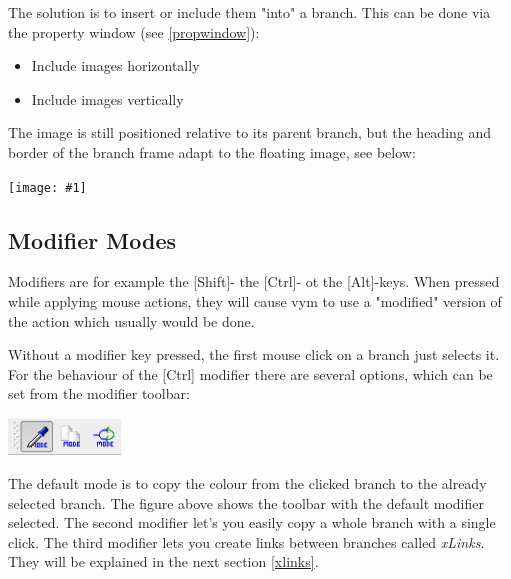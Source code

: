 \documentclass[12pt,a4paper]{article}
\newcommand{\maximage}[1]{  
    \begin{center}
        \texttt{[image: \#1]} 
    \end{center}
}
\newcommand{\vym}{{\sc vym }}
\newcommand{\key}[1]{[#1]}
\begin{document}
The solution is to insert or include them "into" a branch. This can be done via
the property window (see \ref{propwindow}):
\begin{itemize}
    \item Include images horizontally
    \item Include images vertically
\end{itemize}
The image is still positioned relative to its parent branch, but the
heading and border of the branch frame adapt to the floating image, see below: 
    \maximage{images/includeImages.png}

\subsection{Modifier Modes} 
Modifiers are for example the \key{Shift}- the \key{Ctrl}- ot the \key{Alt}-keys. When
pressed while applying mouse actions, they will cause \vym to use
a "modified" version of the action which usually would be done. 


Without a modifier key pressed, the first mouse click on a branch just selects
it. For the behaviour of the \key{Ctrl} modifier there are several
options, which can be set from the modifier toolbar:
\begin{center}
    \includegraphics[width=3cm]{images/modmodes.png}
\end{center}
The default mode is to copy the colour from the clicked branch to the already
selected branch. The figure above shows the toolbar with the default modifier 
selected. The second modifier
let's you easily copy a whole branch with a single click. The third
modifier lets you create links between branches called {\em xLinks}.
They will be explained in the next section \ref{xlinks}.
\end{document}
